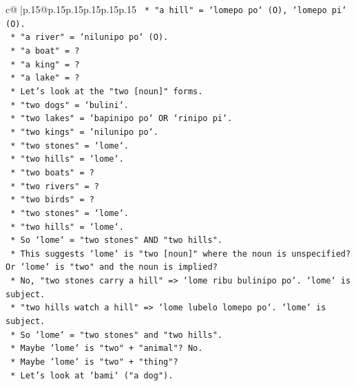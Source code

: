\documentclass{article}
\begin{document}
{\begin{supertabular}{c@{$\;$}|p{.15\linewidth}@{}p{.15\linewidth}p{.15\linewidth}p{.15\linewidth}p{.15\linewidth}p{.15\linewidth}}
{{{\texttt{                    *   "a hill" = `lomepo po` (O), `lomepo pi` (O).} \\
\texttt{                    *   "a river" = `nilunipo po` (O).} \\
\texttt{                    *   "a boat" = ?} \\
\texttt{                    *   "a king" = ?} \\
\texttt{                    *   "a lake" = ?} \\
\texttt{                    *   Let's look at the "two {[}noun{]}" forms.} \\
\texttt{                    *   "two dogs" = `bulini`.} \\
\texttt{                    *   "two lakes" = `bapinipo po` OR `rinipo pi`.} \\
\texttt{                    *   "two kings" = `nilunipo po`.} \\
\texttt{                    *   "two stones" = `lome`.} \\
\texttt{                    *   "two hills" = `lome`.} \\
\texttt{                    *   "two boats" = ?} \\
\texttt{                    *   "two rivers" = ?} \\
\texttt{                    *   "two birds" = ?} \\
\texttt{                    *   "two stones" = `lome`.} \\
\texttt{                    *   "two hills" = `lome`.} \\
\texttt{                    *   So `lome` = "two stones" AND "two hills".} \\
\texttt{                    *   This suggests `lome` is "two {[}noun{]}" where the noun is unspecified? Or `lome` is "two" and the noun is implied?} \\
\texttt{                    *   No, "two stones carry a hill" => `lome ribu bulinipo po`. `lome` is subject.} \\
\texttt{                    *   "two hills watch a hill" => `lome lubelo lomepo po`. `lome` is subject.} \\
\texttt{                    *   So `lome` = "two stones" and "two hills".} \\
\texttt{                    *   Maybe `lome` is "two" + "animal"? No.} \\
\texttt{                    *   Maybe `lome` is "two" + "thing"?} \\
\texttt{                    *   Let's look at `bami` ("a dog").} \\
}}}
\end{supertabular}}
\end{document}
